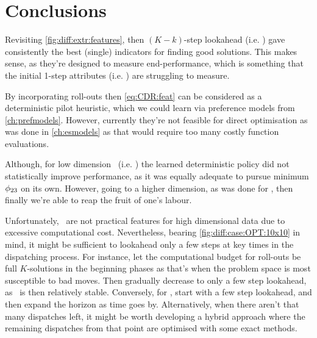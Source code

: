 \section{Conclusions}

Revisiting \cref{fig:diff:extr:features}, then $(K-k)$-step lookahead (i.e. 
\phiGlobalRelated) gave consistently the best (single) indicators for finding 
good solutions. 
This makes sense, as they're designed to measure end-performance, which is 
something that the initial 1-step attributes (i.e. \phiLocalRelated) are 
struggling to measure.

By incorporating roll-outs then \cref{eq:CDR:feat} can be considered as a 
deterministic pilot heuristic, which we could learn via preference models from 
\cref{ch:prefmodels}. However, currently they're not feasible for direct 
optimisation as was done in \cref{ch:esmodels} as that would require too many 
costly function evaluations.

Although, for low dimension \jsp\ (i.e. \Problem[6\times5]{\train}) the learned 
deterministic policy did not statistically improve performance, as it was 
equally adequate to pursue minimum $\phi_{23}$ on its own.
However, going to a higher dimension, as was done for , then finally 
we're able to reap the fruit of one's labour.

Unfortunately, \phiRNDRelated\ are not practical features for high dimensional 
data due to excessive computational cost. 
Nevertheless, bearing \cref{fig:diff:case:OPT:10x10} in mind, it 
might be sufficient to lookahead only a few steps at key times in the 
dispatching process. For instance, let the computational budget for 
 roll-outs be full $K$-solutions in the beginning phases as 
that's when the problem space is most susceptible to bad moves. Then gradually 
decrease to only a few step lookahead, as \fsp\ is then relatively stable.
Conversely, for , start with a few step lookahead, and then 
expand the horizon as time goes by. Alternatively, when there aren't that many 
dispatches left, it might be worth developing a hybrid approach where the 
remaining dispatches from that point are optimised with some exact methods. 
